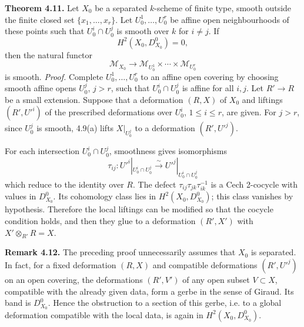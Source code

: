 \documentclass[11pt]{article}
\begin{document}
\textbf{Theorem 4.11.} Let \(X_0\) be a separated \(k\)-scheme of finite type, smooth outside the finite closed set \(\{x_1,\ldots,x_r\}\). Let \(U_0^1,\ldots,U_0^r\) be affine open neighbourhoods of these points such that \(U_0^i\cap U_0^j\) is smooth over \(k\) for \(i\neq j\). If
\[
 H^2(X_0,D^0_{X_0})=0,
\]
then the natural functor
\[
 \mathcal M_{X_0}\to \mathcal M_{U_0^1}\times\cdots\times\mathcal M_{U_0^r}
\]
is smooth.
\textit{Proof.}  Complete \(U_0^1,\ldots,U_0^r\) to an affine open covering by choosing smooth affine opens \(U_0^j\), \(j>r\), such that \(U_0^i\cap U_0^j\) is affine for all \(i,j\). Let \(R'\to R\) be a small extension. Suppose that a deformation \((R,X)\) of \(X_0\) and liftings \((R',U'^i)\) of the prescribed deformations over \(U_0^i\), \(1\leq i\leq r\), are given. For \(j>r\), since \(U_0^j\) is smooth, 4.9(a) lifts \(X|_{U_0^j}\) to a deformation \((R',U'^j)\).

For each intersection \(U_0^i\cap U_0^j\), smoothness gives isomorphisms
\[
 \tau_{ij}: U'^i|_{U_0^i\cap U_0^j}\xrightarrow{\sim}
 U'^j|_{U_0^i\cap U_0^j}
\]
which reduce to the identity over \(R\). The defect \(\tau_{ij}\tau_{jk}\tau_{ik}^{-1}\) is a Cech 2-cocycle with values in \(D^0_{X_0}\). Its cohomology class lies in \(H^2(X_0,D^0_{X_0})\); this class vanishes by hypothesis. Therefore the local liftings can be modified so that the cocycle condition holds, and then they glue to a deformation \((R',X')\) with \(X'\otimes_{R'}R=X\).

\textbf{Remark 4.12.} The preceding proof unnecessarily assumes that \(X_0\) is separated. In fact, for a fixed deformation \((R,X)\) and compatible deformations \((R',U'^j)\) on an open covering, the deformations \((R',V')\) of any open subset \(V\subset X\), compatible with the already given data, form a gerbe in the sense of Giraud. Its band is \(D^0_{X_0}\). Hence the obstruction to a section of this gerbe, i.e. to a global deformation compatible with the local data, is again in \(H^2(X_0,D^0_{X_0})\).
\end{document}
